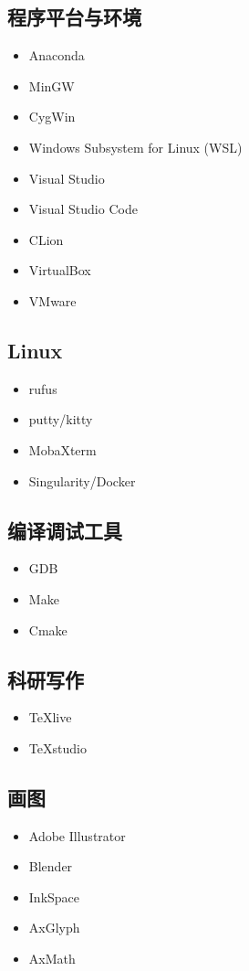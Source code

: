 \subsection{程序平台与环境}
\begin{itemize}
\item Anaconda
\item MinGW
\item CygWin
\item Windows Subsystem for Linux (WSL)
\item Visual Studio
\item Visual Studio Code
\item CLion
\item VirtualBox
\item VMware
\end{itemize}

\subsection{Linux}
\begin{itemize}
\item rufus
\item putty/kitty
\item MobaXterm
\item Singularity/Docker
\end{itemize}

\subsection{编译调试工具}
\begin{itemize}
\item GDB
\item Make
\item Cmake
\end{itemize}

\subsection{科研写作}
\begin{itemize}
\item TeXlive
\item TeXstudio
\end{itemize}

\subsection{画图}
\begin{itemize}
\item Adobe Illustrator
\item Blender
\item InkSpace
\item AxGlyph
\item AxMath
\end{itemize}

